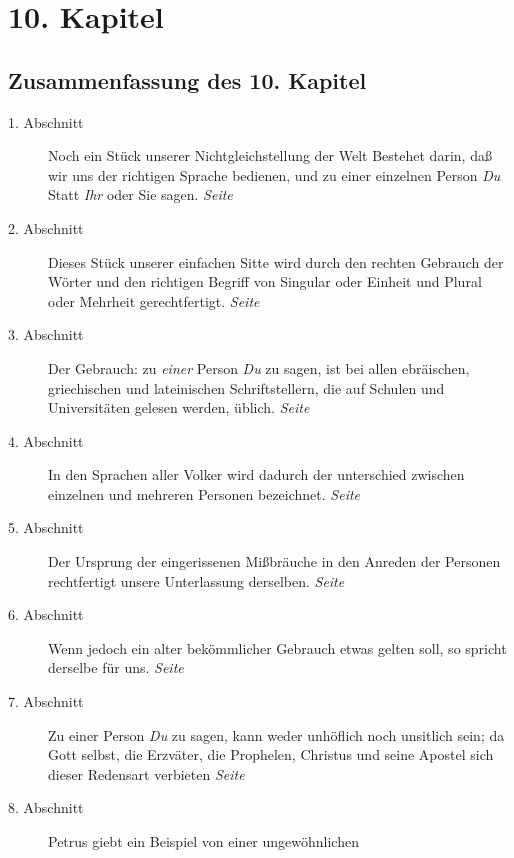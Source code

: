 
\chapter{10. Kapitel} \label{kap10}
\section{Zusammenfassung des 10. Kapitel}


\begin{description}
\item[1. Abschnitt] Noch ein Stück unserer Nichtgleichstellung der Welt Bestehet
darin, daß wir uns der richtigen Sprache bedienen, und zu einer einzelnen Person
\textit{Du} Statt \textit{Ihr} oder Sie sagen.
\dotfill \textit{Seite \pageref{kap10_ab1}}\\
\item[2. Abschnitt] Dieses Stück unserer einfachen Sitte wird durch den rechten
Gebrauch der Wörter und den richtigen Begriff von Singular oder Einheit und
Plural oder Mehrheit gerechtfertigt.
\dotfill \textit{Seite \pageref{kap10_ab2}}\\
\item[3. Abschnitt] Der Gebrauch: zu \textit{einer} Person \textit{Du} zu sagen,
ist bei
allen ebräischen, griechischen und lateinischen Schriftstellern, die auf
Schulen und Universitäten gelesen werden, üblich.
\dotfill \textit{Seite \pageref{kap10_ab3}}\\
\item[4. Abschnitt] In den Sprachen aller Volker wird dadurch der unterschied
zwischen einzelnen und mehreren Personen bezeichnet.
\dotfill \textit{Seite \pageref{kap10_ab4}}\\
\item[5. Abschnitt] Der Ursprung der eingerissenen Mißbräuche in den Anreden der
Personen rechtfertigt unsere Unterlassung derselben.
\dotfill \textit{Seite \pageref{kap10_ab5}}\\
\item[6. Abschnitt] Wenn jedoch ein alter bekömmlicher Gebrauch etwas gelten
soll, so spricht derselbe für uns.
\dotfill \textit{Seite \pageref{kap10_ab6}}\\
\item[7. Abschnitt] Zu einer Person \textit{Du} zu sagen, kann weder unhöflich
noch
unsitlich sein; da Gott selbst, die Erzväter, die Prophelen, Christus und
seine Apostel sich dieser Redensart verbieten
\dotfill \textit{Seite \pageref{kap10_ab7}}\\
\item[8. Abschnitt] Petrus giebt ein Beispiel von einer ungewöhnlichen

\end{description}
